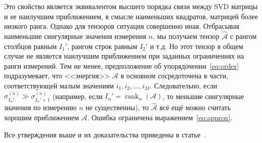\documentclass[specialist,
    substylefile = spbu_report.rtx,
    subf,href,colorlinks=true, 12pt]{disser}
\theoremstyle{plain}
\theoremstyle{definition}
\theoremstyle{remark}
\begin{document}
    Это свойство является эквивалентом высшего порядка связи между SVD матрицы и ее наилучшим приближением,
    в смысле наименьших квадратов, матрицей более низкого ранга.
    Однако для тензоров ситуация совершенно иная.
    Отбрасывая наименьшие сингулярные значения измерения $n$, мы получаем тензор $\hat{\mathcal{A}}$ с рангом столбцов
    равным $I_1'$, рангом строк равным $I_2'$ и т.д.
    Но этот тензор в общем случае не является наилучшим приближением при заданных ограничениях на ранги измерений.
    Тем не менее, предположение об упорядочении~\eqref{eq:order} подразумевает, что <<энергия>> $\mathcal{A}$ в основном сосредоточена в части,
    соответствующей малым значениям $i_1, i_2, \ldots, i_M$.
    Следовательно, если $\sigma^{(n)}_{I_n'} \gg \sigma^{(n)}_{I_n'+1}$ (например, если $I_n'=\operatorname{rank}_n(\mathcal{A})$,
    то меньшие сингулярные значения по измерению $n$ не существенны), то $\hat{\mathcal{A}}$ всё ещё можно считать хорошим приближением $\mathcal{A}$.
    Ошибка ограничена выражением~\eqref{eq:approx}.


    Все утверждения выше и их доказательства приведены в статье~\cite{hosvd}.
\end{document}
